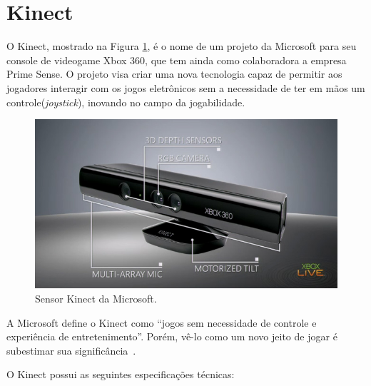 \section{Kinect}
\label{sec:kinect}

O Kinect, mostrado na Figura \ref{kinect}, é o nome de um projeto da Microsoft para seu console de videogame Xbox 360, que tem ainda como colaboradora a empresa Prime Sense. O projeto visa criar uma nova tecnologia capaz de permitir aos jogadores interagir com os jogos eletrônicos sem a necessidade de ter em mãos um controle(\textit{joystick}), inovando no campo da jogabilidade.

	\begin{figure}[hbt]
		\begin{center}
			\includegraphics[scale=0.5]{figuras/2.FundamentacaoTeorica/kinect.jpg}
		\end{center}
		\caption{Sensor Kinect da Microsoft.}
		\label{kinect}
	\end{figure}

A Microsoft define o Kinect como ``jogos sem necessidade de controle e experiência de entretenimento''. Porém, vê-lo como um novo jeito de jogar é subestimar sua significância~\cite{kinect}. 

	O Kinect possui as seguintes especificações técnicas:

